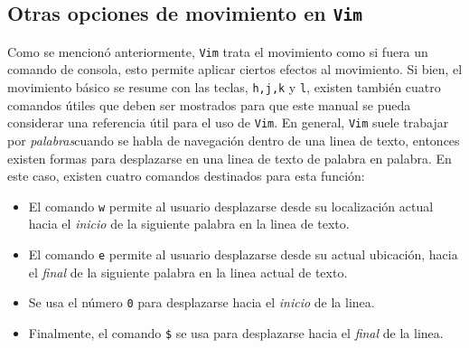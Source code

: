 \documentclass[10pt]{article}
\begin{document}
\subsection{Otras opciones de movimiento en \texttt{Vim}}
Como se mencionó anteriormente, \texttt{Vim} trata el movimiento como si fuera un comando de consola, esto permite aplicar ciertos efectos al movimiento.
Si bien, el movimiento básico se resume con las teclas, \texttt{h,j,k} y \texttt{l}, existen también cuatro comandos útiles que deben ser mostrados para que este manual se pueda considerar una referencia útil para el uso de \texttt{Vim}.
En general, \texttt{Vim} suele trabajar por \textit{palabras}cuando se habla de navegación dentro de una linea de texto, entonces existen formas para desplazarse en una linea de texto de palabra en palabra. En este caso, existen cuatro comandos destinados para esta función:
\begin{itemize}
	\item El comando \texttt{w} permite al usuario desplazarse desde su localización actual hacia el \textit{inicio} de la siguiente palabra en la linea de texto. 
	\item El comando \texttt{e} permite al usuario desplazarse desde su actual ubicación, hacia el \textit{final} de la siguiente palabra en la linea actual de texto.
	\item Se usa el número \texttt{0} para desplazarse hacia el \textit{inicio} de la linea.
	\item Finalmente, el comando \texttt{\$} se usa para desplazarse hacia el \textit{final} de la linea.
\end{itemize}
\end{document}

